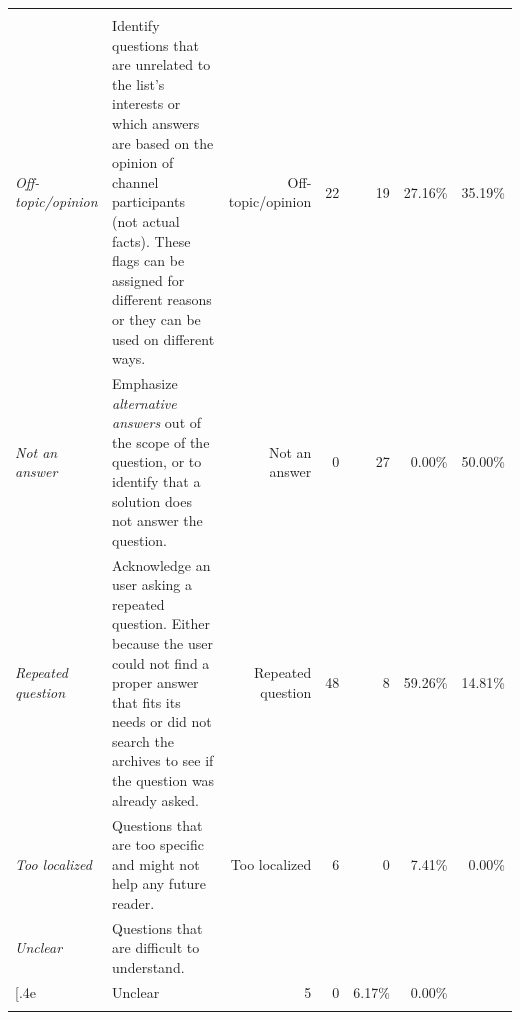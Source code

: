 \begin{table}[!htb]
\begin{small}
\begin{tabular}[h]{p{2.3cm}p{10.3cm}rrrrr}

\end{tabular}
\end{small}
\end{table}
